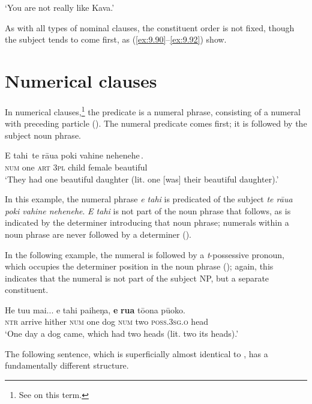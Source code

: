\glt
‘You are not really like Kava.’ \textstyleExampleref{[R229.488]} 
\z

As with all types of nominal clauses, the constituent order is not fixed, though the subject tends to come first, as (\ref{ex:9.90}–\ref{ex:9.92}) show.

\section{Numerical clauses}\label{sec:9.5}
In numerical clauses,\footnote{\label{fn:479}See \citet[108]{Clark1969} on this term.} the predicate is a numeral phrase, consisting of a numeral with preceding particle (). The numeral predicate comes first; it is followed by the subject noun phrase.

\ea\label{ex:9.93}
\gll {\ob}E tahi\,{\cb} {\ob}te rāua poki vahine nehenehe\,{\cb}. \\
{\db}\textsc{num} one {\db}\textsc{art} \textsc{3pl} child female beautiful \\

\glt
‘They had one beautiful daughter (lit. one [was] their beautiful daughter).’ \textstyleExampleref{[R338.001]} 
\z

In this example, the numeral phrase \textit{e tahi} is predicated of the subject \textit{te rāua poki vahine nehenehe}. \textit{E tahi} is not part of the noun phrase that follows, as is indicated by the determiner introducing that noun phrase; numerals within a noun phrase are never followed by a determiner (). 

In the following example, the numeral is followed by a \textit{t}{}-possessive pronoun, which occupies the determiner position in the noun phrase (); again, this indicates that the numeral is not part of the subject NP, but a separate constituent.

\ea\label{ex:9.94}
\gll He tu{\ꞌ}u mai... e tahi paiheŋa, \textbf{e} \textbf{rua} tō{\ꞌ}ona pū{\ꞌ}oko. \\
\textsc{ntr} arrive hither \textsc{num} one dog \textsc{num} two \textsc{poss.3sg.o} head \\

\glt 
‘One day a dog came, which had two heads (lit. two its heads).’ \textstyleExampleref{[R435.003]} 
\z

The following sentence, which is superficially almost identical to , has a fundamentally different structure.

